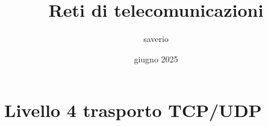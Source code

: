 \documentclass{report}
\title{Reti di telecomunicazioni}
\author{saverio}
\date{giugno 2025}
\begin{document}
\maketitle
\tableofcontents


%


%

\chapter{Livello 4 trasporto TCP/UDP}


%

%

\end{document}
